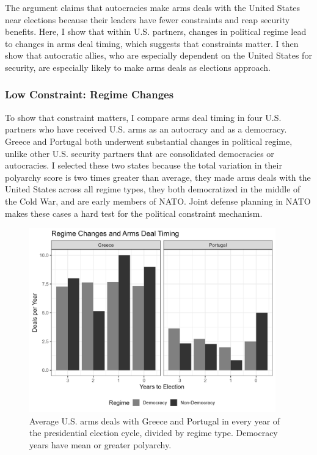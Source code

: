 \documentclass[12pt]{article}
\begin{document}
The argument claims that autocracies make arms deals with the United States near elections because their leaders have fewer constraints and reap security benefits. 
Here, I show that within U.S. partners, changes in political regime lead to changes in arms deal timing, which suggests that constraints matter. 
I then show that autocratic allies, who are especially dependent on the United States for security, are especially likely to make arms deals as elections approach.


\subsubsection{Low Constraint: Regime Changes}


To show that constraint matters, I compare arms deal timing in four U.S. partners who have received U.S. arms as an autocracy and as a democracy. 
Greece and Portugal both underwent substantial changes in political regime, unlike other U.S. security partners that are consolidated democracies or autocracies. 
I selected these two states because the total variation in their polyarchy score is two times greater than average, they made arms deals with the United States across all regime types, they both democratized in the middle of the Cold War, and are early members of NATO. 
Joint defense planning in NATO makes these cases a hard test for the political constraint mechanism.


\begin{figure}[htpb]
	\centering
		\includegraphics[width=0.95\textwidth]{../figures/deals-regime-change.png}
	\caption{Average U.S. arms deals with Greece and Portugal in every year of the presidential election cycle, divided by regime type. Democracy years have mean or greater polyarchy.}
	\label{fig:deals-regime-change}
\end{figure}
\end{document}
